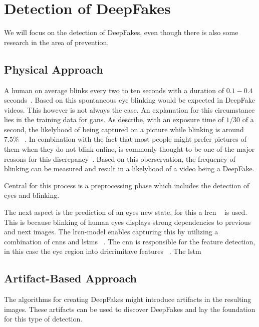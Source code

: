 \section{Detection of DeepFakes}
We will focus on the detection of DeepFakes, even though there is also some 
research in the area of prevention.

\subsection{Physical Approach}
A human on average blinks every two to ten seconds with a duration of \(0.1-0.4\)
seconds~\cite{li_ictu_2018}. Based on this spontaneous eye blinking would be
expected in DeepFake videos. This however is not always the case. An explanation
for this circumstance lies in the training data for \glspl{gan}. As 
\textcite{li_ictu_2018} describe, with an exposure time of \(1/30\) of a second,
the likelyhood of being captured on a picture while blinking is around \(7.5\%\)
~\cite{li_ictu_2018}. In combination with the fact that most people might prefer
pictures of them when they do not blink online, is commonly thought to be one of
the major reasons for this discrepancy~\cite{pishori_detecting_2020}. Based on
this oberservation, the frequency of blinking can be measured and result in a 
likelyhood of a video being a DeepFake.

\par
Central for this process is a preprocessing phase which includes the detection
of eyes and blinking.

\par
The next aspect is the prediction of an eyes new state, for this a \gls{lrcn}
~\cite{donahue_long-term_2014} is used. This is because blinking of human eyes
displays strong dependencies to previous and next images. The \gls{lrcn}-model 
enables capturing this by utilizing a combination of \glspl{cnn} and \glspl{lstm}
~\cite{donahue_long-term_2014}. The \gls{cnn} is responsible for the feature
detection, in this case the eye region into dricrimitave features
~\cite{li_ictu_2018,donahue_long-term_2014}. 
The \gls{lstm} 


\subsection{Artifact-Based Approach}
The algorithms for creating DeepFakes might introduce artifacts in the resulting
images. These artifacts can be used to discover DeepFakes and lay the foundation for
this type of detection.

